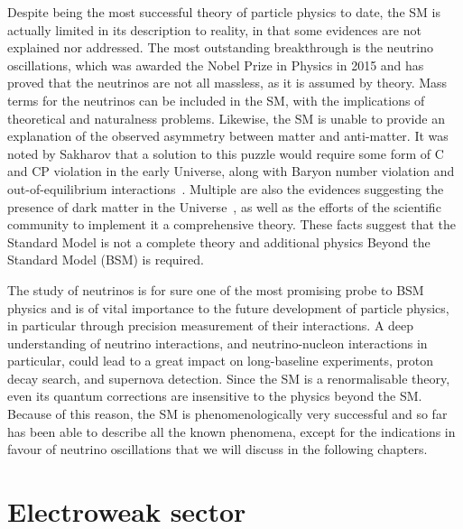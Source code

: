 Despite being the most successful theory of particle physics to date, the SM is actually limited %
in its description to reality, in that some evidences are not explained nor addressed.
The most outstanding breakthrough is the neutrino oscillations, which was awarded the Nobel Prize in Physics in 2015 %
and has proved that the neutrinos are not all massless, as it is assumed by theory.
Mass terms for the neutrinos can be included in the SM, with the implications of theoretical and naturalness problems.
Likewise, the SM is unable to provide an explanation of the observed asymmetry between matter and anti-matter.
It was noted by Sakharov that a solution to this puzzle would require some form of C and CP violation %
in the early Universe, along with Baryon number violation and out-of-equilibrium interactions~\cite{Sakharov:1967dj}.
Multiple are also the evidences suggesting the presence of dark matter in the Universe~\cite{Zwicky:1933gu, Rubin:1970zza, Aghanim:2018eyx}, %
as well as the efforts of the scientific community to implement it a comprehensive theory.
These facts suggest that the Standard Model is not a complete theory and additional physics %
Beyond the Standard Model (BSM) is required.

The study of neutrinos is for sure one of the most promising probe to BSM physics and %
is of vital importance to the future development of particle physics, %
in particular through precision measurement of their interactions.
A deep understanding of neutrino interactions, and neutrino-nucleon interactions in particular, %
could lead to a great impact on long-baseline experiments, proton decay search, and supernova detection.
Since the SM is a renormalisable theory, even its quantum corrections are insensitive to the physics beyond the SM.
Because of this reason, the SM is phenomenologically very successful and so far has been able to describe all the known
phenomena, except for the indications in favour of neutrino oscillations that we will discuss in the following chapters.

\section{Electroweak sector}
\label{sec:ew_sector}

